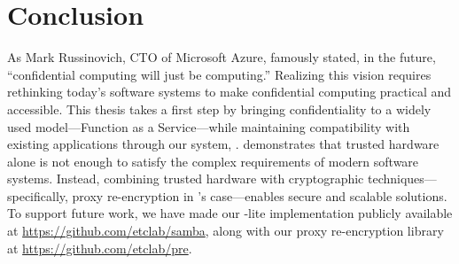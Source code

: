 \section{Conclusion}
\label{sec:conclusion}

As Mark Russinovich, CTO of Microsoft Azure, famously stated, in the future,
``confidential computing will just be computing.''
%
Realizing this vision requires rethinking today's software systems to make
confidential computing practical and accessible.
%
This thesis takes a first step by bringing confidentiality to a widely used
model---Function as a Service---while maintaining compatibility with existing
applications through our system, \SystemName.
%
\SystemName demonstrates that trusted hardware alone is not enough to satisfy
the complex requirements of modern software systems.
%
Instead, combining trusted hardware with cryptographic
techniques---specifically, proxy re-encryption in \SystemName's case---enables
secure and scalable solutions.
%
To support future work, we have made our \SystemName-lite implementation
publicly available at \url{https://github.com/etclab/samba}, along with our
proxy re-encryption library at \url{https://github.com/etclab/pre}.






